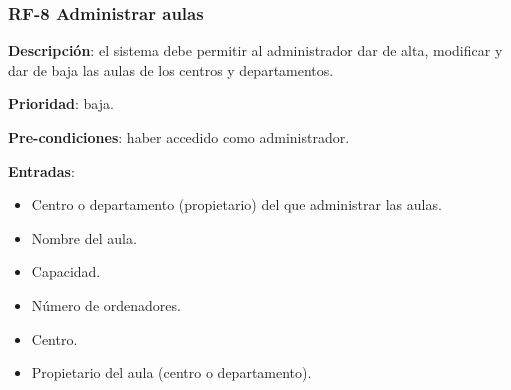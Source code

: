\subsubsection{RF-8 Administrar aulas}

\textbf{Descripción}: el sistema debe permitir al administrador dar de alta, modificar y dar de baja las aulas de los centros y departamentos.

\textbf{Prioridad}: baja.

\textbf{Pre-condiciones}: haber accedido como administrador.

\textbf{Entradas}:
    \begin{itemize}
    \tightlist
        \item Centro o departamento (propietario) del que administrar las aulas.
        \item Nombre del aula.
        \item Capacidad.
        \item Número de ordenadores.
        \item Centro.
        \item Propietario del aula (centro o departamento).
    \end{itemize}

